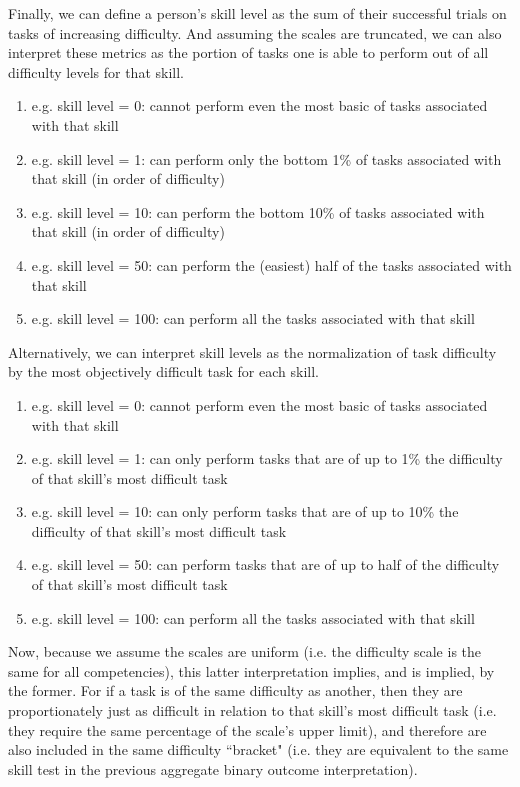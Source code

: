 \documentclass{elsarticle} %
\begin{document}
Finally, we can define a person's skill level as the sum of their successful trials on tasks of increasing difficulty. And assuming the scales are truncated, we can also interpret these metrics as the portion of tasks one is able to perform out of all difficulty levels for that skill.

\begin{enumerate}
    \item e.g. skill level = 0: cannot perform even the most basic of tasks associated with that skill
    \item e.g. skill level = 1: can perform only the bottom 1\% of tasks associated with that skill (in order of difficulty)
    \item e.g. skill level = 10: can perform the bottom 10\% of tasks associated with that skill (in order of difficulty)
    \item e.g. skill level = 50: can perform the (easiest) half of the tasks associated with that skill
    \item e.g. skill level = 100: can perform all the tasks associated with that skill
\end{enumerate}

Alternatively, we can interpret skill levels as the normalization of task difficulty by the most objectively difficult task for each skill.
\begin{enumerate}
    \item e.g. skill level = 0: cannot perform even the most basic of tasks associated with that skill
    \item e.g. skill level = 1: can only perform tasks that are of up to 1\% the difficulty of that skill's most difficult task
    \item e.g. skill level = 10: can only perform tasks that are of up to 10\% the difficulty of that skill's most difficult task
    \item e.g. skill level = 50: can perform tasks that are of up to half of the difficulty of that skill's most difficult task
    \item e.g. skill level = 100: can perform all the tasks associated with that skill
\end{enumerate}

Now, because we assume the scales are uniform (i.e. the difficulty scale is the same for all competencies), this latter interpretation implies, and is implied, by the former. For if a task is of the same difficulty as another, then they are proportionately just as difficult in relation to that skill's most difficult task (i.e. they require the same percentage of the scale's upper limit), and therefore are also included in the same difficulty ``bracket" (i.e. they are equivalent to the same skill test in the previous aggregate binary outcome interpretation).
\end{document}
